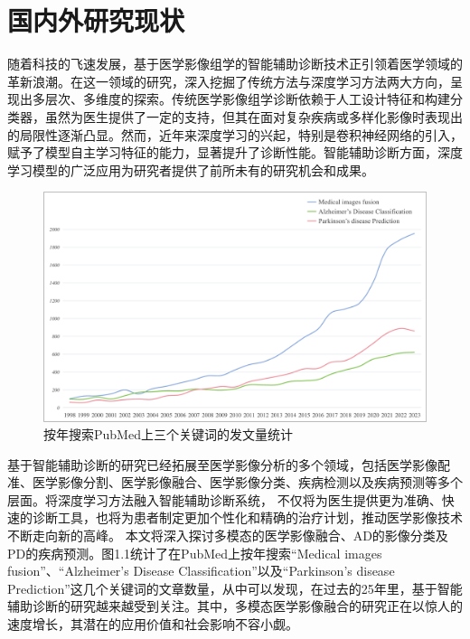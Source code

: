 \section{国内外研究现状}
随着科技的飞速发展，基于医学影像组学的智能辅助诊断技术正引领着医学领域的革新浪潮。在这一领域的研究，深入挖掘了传统方法与深度学习方法两大方向，呈现出多层次、多维度的探索。传统医学影像组学诊断依赖于人工设计特征和构建分类器，虽然为医生提供了一定的支持，但其在面对复杂疾病或多样化影像时表现出的局限性逐渐凸显。然而，近年来深度学习的兴起，特别是卷积神经网络的引入，赋予了模型自主学习特征的能力，显著提升了诊断性能。智能辅助诊断方面，深度学习模型的广泛应用为研究者提供了前所未有的研究机会和成果。

  \begin{figure}[htbp]
      \centering  
      \includegraphics[width=0.9\linewidth]{figs/paperNumber.pdf}  
      \caption{按年搜索PubMed上三个关键词的发文量统计}\label{paperNumber}
    \end{figure}

基于智能辅助诊断的研究已经拓展至医学影像分析的多个领域，包括医学影像配准\cite{balakrishnan2019voxelmorph,ashburner2007fast}、医学影像分割\cite{sharma2010automated,zhou2018unet++,chen2021transunet}、医学影像融合\cite{anwar2018medical,dogra2023multi,tang2022image}、医学影像分类\cite{dai2021transmed,frid2018gan,wang2017chestx}、疾病检测\cite{gaitonde2017chronic,ferentinos2018deep}以及疾病预测\cite{dahiwade2019designing,shah2020heart,krishnamoorthi2022novel}等多个层面。将深度学习方法融入智能辅助诊断系统，
不仅将为医生提供更为准确、快速的诊断工具，也将为患者制定更加个性化和精确的治疗计划，推动医学影像技术不断走向新的高峰。
本文将深入探讨多模态的医学影像融合、AD的影像分类及PD的疾病预测。图1.1统计了在PubMed上按年搜索“Medical images fusion”、“Alzheimer’s Disease Classification”以及“Parkinson’s disease Prediction”这几个关键词的文章数量，从中可以发现，在过去的25年里，基于智能辅助诊断的研究越来越受到关注。其中，多模态医学影像融合的研究正在以惊人的速度增长，其潜在的应用价值和社会影响不容小觑。

